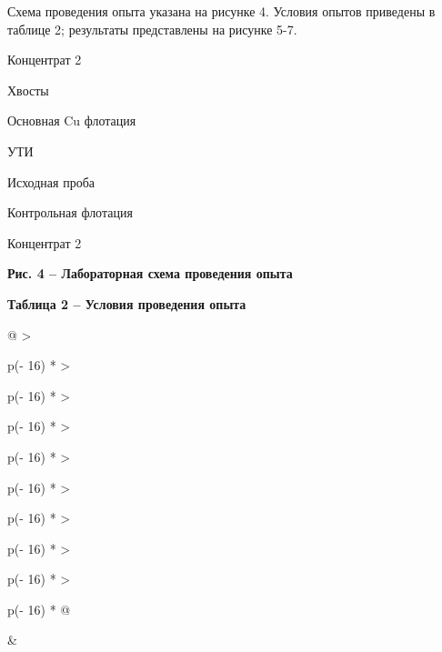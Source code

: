 Схема проведения опыта указана на рисунке 4. Условия опытов приведены в
таблице 2; результаты представлены на рисунке 5-7.

Концентрат 2

Хвосты

Основная Cu флотация

УТИ

Исходная проба

Контрольная флотация

Концентрат 2

{\bfseries Рис. 4 -- Лабораторная схема проведения опыта}

{\bfseries Таблица 2 -- Условия проведения опыта}

\begin{longtable}[]{@{}
  >{\raggedright\arraybackslash}p{(\columnwidth - 16\tabcolsep) * }
  >{\raggedright\arraybackslash}p{(\columnwidth - 16\tabcolsep) * }
  >{\raggedright\arraybackslash}p{(\columnwidth - 16\tabcolsep) * }
  >{\raggedright\arraybackslash}p{(\columnwidth - 16\tabcolsep) * }
  >{\raggedright\arraybackslash}p{(\columnwidth - 16\tabcolsep) * }
  >{\raggedright\arraybackslash}p{(\columnwidth - 16\tabcolsep) * }
  >{\raggedright\arraybackslash}p{(\columnwidth - 16\tabcolsep) * }
  >{\raggedright\arraybackslash}p{(\columnwidth - 16\tabcolsep) * }
  >{\raggedright\arraybackslash}p{(\columnwidth - 16\tabcolsep) * }@{}}
\toprule\noalign{}
 &
\end{longtable}

